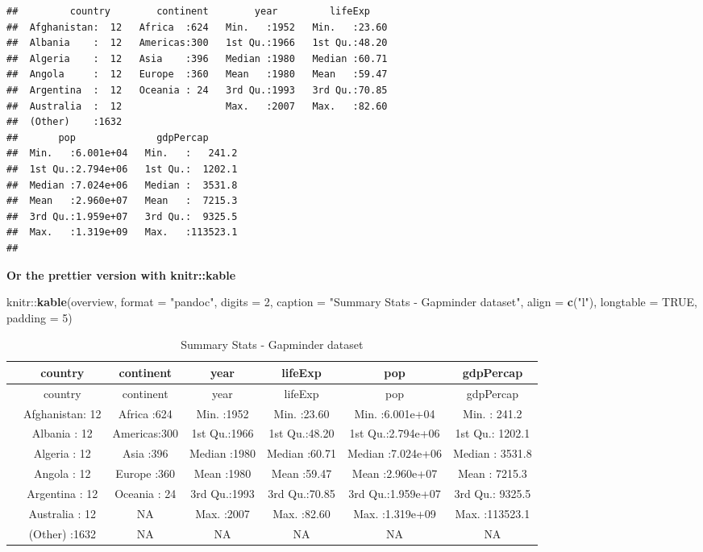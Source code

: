 \documentclass[]{article}
\newenvironment{Shaded}{\begin{snugshade}}{\end{snugshade}}
\newcommand{\KeywordTok}[1]{\textcolor[rgb]{0.13,0.29,0.53}{\textbf{{#1}}}}
\newcommand{\DataTypeTok}[1]{\textcolor[rgb]{0.13,0.29,0.53}{{#1}}}
\newcommand{\DecValTok}[1]{\textcolor[rgb]{0.00,0.00,0.81}{{#1}}}
\newcommand{\StringTok}[1]{\textcolor[rgb]{0.31,0.60,0.02}{{#1}}}
\newcommand{\OtherTok}[1]{\textcolor[rgb]{0.56,0.35,0.01}{{#1}}}
\newcommand{\NormalTok}[1]{{#1}}
\begin{document}
\begin{verbatim}
##         country        continent        year         lifeExp     
##  Afghanistan:  12   Africa  :624   Min.   :1952   Min.   :23.60  
##  Albania    :  12   Americas:300   1st Qu.:1966   1st Qu.:48.20  
##  Algeria    :  12   Asia    :396   Median :1980   Median :60.71  
##  Angola     :  12   Europe  :360   Mean   :1980   Mean   :59.47  
##  Argentina  :  12   Oceania : 24   3rd Qu.:1993   3rd Qu.:70.85  
##  Australia  :  12                  Max.   :2007   Max.   :82.60  
##  (Other)    :1632                                                
##       pop              gdpPercap       
##  Min.   :6.001e+04   Min.   :   241.2  
##  1st Qu.:2.794e+06   1st Qu.:  1202.1  
##  Median :7.024e+06   Median :  3531.8  
##  Mean   :2.960e+07   Mean   :  7215.3  
##  3rd Qu.:1.959e+07   3rd Qu.:  9325.5  
##  Max.   :1.319e+09   Max.   :113523.1  
## 
\end{verbatim}

\textbf{Or the prettier version with knitr::kable}

\begin{Shaded}
\begin{Highlighting}[]
\NormalTok{knitr::}\KeywordTok{kable}\NormalTok{(overview, }
             \DataTypeTok{format =} \StringTok{"pandoc"}\NormalTok{, }
             \DataTypeTok{digits =} \DecValTok{2}\NormalTok{,}
             \DataTypeTok{caption =} \StringTok{"Summary Stats - Gapminder dataset"}\NormalTok{,}
             \DataTypeTok{align =} \KeywordTok{c}\NormalTok{(}\StringTok{"l"}\NormalTok{),}
             \DataTypeTok{longtable =} \OtherTok{TRUE}\NormalTok{,}
             \DataTypeTok{padding =} \DecValTok{5}\NormalTok{)}
\end{Highlighting}
\end{Shaded}

\begin{longtable}[]{@{}lcccccc@{}}
\caption{Summary Stats - Gapminder dataset}\tabularnewline
\toprule
& country & continent & year & lifeExp & pop & gdpPercap\tabularnewline
\midrule
\endfirsthead
\toprule
& country & continent & year & lifeExp & pop & gdpPercap\tabularnewline
\midrule
\endhead
& Afghanistan: 12 & Africa :624 & Min. :1952 & Min. :23.60 & Min.
:6.001e+04 & Min. : 241.2\tabularnewline
& Albania : 12 & Americas:300 & 1st Qu.:1966 & 1st Qu.:48.20 & 1st
Qu.:2.794e+06 & 1st Qu.: 1202.1\tabularnewline
& Algeria : 12 & Asia :396 & Median :1980 & Median :60.71 & Median
:7.024e+06 & Median : 3531.8\tabularnewline
& Angola : 12 & Europe :360 & Mean :1980 & Mean :59.47 & Mean :2.960e+07
& Mean : 7215.3\tabularnewline
& Argentina : 12 & Oceania : 24 & 3rd Qu.:1993 & 3rd Qu.:70.85 & 3rd
Qu.:1.959e+07 & 3rd Qu.: 9325.5\tabularnewline
& Australia : 12 & NA & Max. :2007 & Max. :82.60 & Max. :1.319e+09 &
Max. :113523.1\tabularnewline
& (Other) :1632 & NA & NA & NA & NA & NA\tabularnewline
\bottomrule
\end{longtable}
\end{document}

